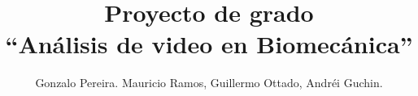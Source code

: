 \documentclass[11pt,a4paper,titlepage,spanish]{article}
\title{Proyecto de grado\\ ``Análisis de video en Biomecánica''}
\author{Gonzalo Pereira. Mauricio Ramos, Guillermo Ottado, Andréi Guchin.}
\date {}
\begin{document}
\maketitle

\newpage
\tableofcontents
\newpage




\clearpage

\clearpage

\clearpage

\clearpage

\clearpage

\clearpage

\clearpage

\clearpage

\clearpage

\clearpage

\clearpage

\clearpage

\nocite{*} %




%
%

\end{document}
